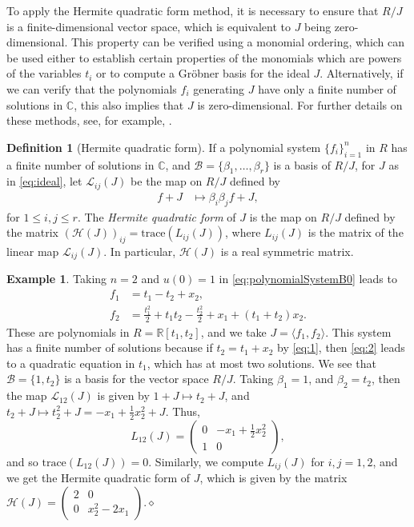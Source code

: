 \documentclass[11pt]{amsart}
\newcommand{\C}{\mathbb{C}}
\newcommand{\R}{\mathbb{R}}
\newcommand{\calF}{\mathcal{F}}
\newcommand{\calH}{\mathcal{H}}
\newcommand{\calL}{\mathcal{L}}
\newcommand{\trace}{\mathrm{trace}}
\theoremstyle{definition}
\newtheorem{definition}[theorem]{Definition}
\newtheorem{example}[theorem]{Example}
\theoremstyle{remark}
\numberwithin{equation}{section}
\begin{document}
To apply the Hermite quadratic form method, it is necessary to ensure that $R/J$ is a finite-dimensional vector space, which is equivalent to $J$ being zero-dimensional.
This property can be verified using a monomial ordering, which can be used either to establish certain properties of the monomials which are powers of the variables $t_i$ or to compute a Gröbner basis for the ideal $J$.
Alternatively, if we can verify that 
the polynomials $f_i$ generating $J$ have only a finite number of solutions in $\C$, this also implies that $J$ is zero-dimensional.
For further details on these methods, see, for example, \cite[§3, Chapter 5]{idealsVarietiesAlgorithms}. 
\begin{definition}[Hermite quadratic form]
If a polynomial system $\bigl\{f_i\bigr\}_{i=1}^n$ %
in $R$ has a finite number of solutions in $\C$, and $\mathcal{B}={\{\beta_1,\dots,\beta_r\}}$ is a basis of $R/J$, for $J$ as in \eqref{eq:ideal}, let $\mathcal{L}_{ij}(J)$ be the map on $R/J$ defined by
\begin{align*}
f+J&\mapsto {\beta_i\beta_j}f+J,
\end{align*}
for $1\leq i,j\leq r$. The \emph{Hermite quadratic form} of $J$ is the map 
on $R/J$ defined by 
the matrix $(\mathcal{H}(J))_{ij}=\trace(L_{ij}(J))$, where $L_{ij}(J)$ is the matrix of the linear map $\mathcal{L}_{ij}(J)$. In particular, $\calH(J)$ is a real symmetric matrix. 
\end{definition}
\begin{example}\label{exampleH}
Taking $n=2$ and $u(0)=1$ in \eqref{eq:polynomialSystemB0} leads to
\begin{align}
 f_1&=t_1-t_2+x_2,\label{eq:1}\\
 f_2&=\frac{t_1^2}{2}+t_1t_2-\frac{t_2^2}{2}+x_1+(t_1+t_2)x_2.\label{eq:2}
\end{align}
These are polynomials in $R=\R[t_1,t_2]$, and we take $J=\langle f_1,f_2\rangle$. This system has a finite number of solutions because if $ t_2=t_1+x_2$ by \eqref{eq:1}, then \eqref{eq:2} leads to a quadratic equation in $t_1$, which has at most two solutions. 
We see that $\mathcal{B} = \{1,t_2\}$ is a basis for the vector space $R/J$. Taking $\beta_1=1$, and $\beta_2=t_2$, then the map $\calL_{12}(J)$ is given by $1+J\mapsto t_2+J$, and $t_2+J\mapsto t_2^2+J= -x_1+\frac{1}{2}x_2^2 +J$. Thus, 
\[
L_{12}(J)=
\begin{pmatrix}
 0&-x_1+\frac{1}{2}x_2^2\\
 1&0
 \end{pmatrix},
\]
and so $\trace(L_{12}(J))=0$. 
Similarly, we compute $L_{ij}(J)$ for $i,j=1,2$, and we get the Hermite quadratic form of $J$, which is given by the matrix
$\mathcal{H}(J)=
\begin{pmatrix}
 2&0\\
 0&x_2^2-2x_1
\end{pmatrix}.$\hfill$\diamond$
\end{example}
\end{document}
